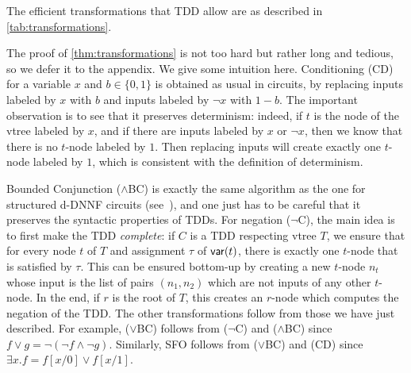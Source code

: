 \documentclass[a4paper,UKenglish,cleveref, autoref, thm-restate]{lipics-v2021}
\begin{document}
\begin{theorem}[$\star$]\label{thm:transformations}
	The efficient transformations that TDD allow are as described in \cref{tab:transformations}. 
\end{theorem}
The proof of \cref{thm:transformations} is not too hard but rather long and tedious, so we defer it to the appendix. We give some intuition here. Conditioning (CD) for a variable $x$ and $b \in \{0,1\}$ is obtained as usual in circuits, by replacing inputs labeled by $x$ with $b$ and inputs labeled by $\neg x$ with $1-b$. The important observation is to see that it preserves determinism: indeed, if $t$ is the node of the vtree labeled by $x$, and if there are inputs labeled by $x$ or $\neg x$, then we know that there is no $t$-node labeled by $1$. Then replacing inputs will create exactly one $t$-node labeled by $1$, which is consistent with the definition of determinism.

Bounded Conjunction ($\wedge$BC) is exactly the same algorithm as the one for structured d-DNNF circuits (see~\cite{PipatsrisawatD08}), and one just has to be careful that it preserves the syntactic properties of TDDs.
%
For negation ($\neg$C), the main idea is to first make the TDD \emph{complete}: if $C$ is a TDD respecting vtree $T$, we ensure that for every node $t$ of $T$ and assignment $\tau$ of $\mathsf{var}(t)$, there is exactly one $t$-node that is satisfied by $\tau$. This can be ensured bottom-up by creating a new $t$-node $n_t$ whose input is the list of pairs $(n_1,n_2)$ which are not inputs of any other $t$-node. In the end, if $r$ is the root of $T$, this creates an $r$-node which computes the negation of the TDD. 
%
The other transformations follow from those we have just described. For example, ($\vee$BC) follows from ($\neg$C) and ($\wedge$BC) since $f \vee g = \neg (\neg f \wedge \neg g)$. Similarly, SFO follows from ($\vee$BC) and (CD) since $\exists x.f = f[x/0] \vee f[x/1]$. 
\end{document}
